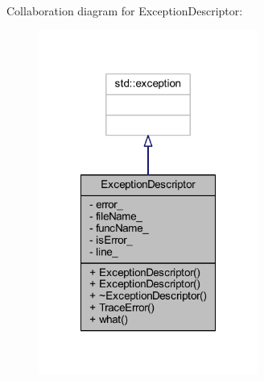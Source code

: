 Collaboration diagram for Exception\-Descriptor\-:
\nopagebreak
\begin{figure}[H]
\begin{center}
\leavevmode
\includegraphics[width=204pt]{class_exception_descriptor__coll__graph}
\end{center}
\end{figure}
